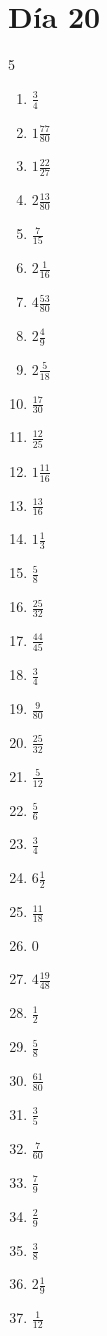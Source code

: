 \documentclass[12pt]{article}
\begin{document}
\section*{Día 20}
\begin{multicols}{5}\begin{enumerate}
\item $ \frac{3}{4} $
\item $ 1 \frac{77}{80} $
\item $ 1 \frac{22}{27} $
\item $ 2 \frac{13}{80} $
\item $ \frac{7}{15} $
\item $ 2 \frac{1}{16} $
\item $ 4 \frac{53}{80} $
\item $ 2 \frac{4}{9} $
\item $ 2 \frac{5}{18} $
\item $ \frac{17}{30} $
\item $ \frac{12}{25} $
\item $ 1 \frac{11}{16} $
\item $ \frac{13}{16} $
\item $ 1 \frac{1}{3} $
\item $ \frac{5}{8} $
\item $ \frac{25}{32} $
\item $ \frac{44}{45} $
\item $ \frac{3}{4} $
\item $ \frac{9}{80} $
\item $ \frac{25}{32} $
\item $ \frac{5}{12} $
\item $ \frac{5}{6} $
\item $ \frac{3}{4} $
\item $ 6 \frac{1}{2} $
\item $ \frac{11}{18} $
\item $ 0 $
\item $ 4 \frac{19}{48} $
\item $ \frac{1}{2} $
\item $ \frac{5}{8} $
\item $ \frac{61}{80} $
\item $ \frac{3}{5} $
\item $ \frac{7}{60} $
\item $ \frac{7}{9} $
\item $ \frac{2}{9} $
\item $ \frac{3}{8} $
\item $ 2 \frac{1}{9} $
\item $ \frac{1}{12} $

\end{enumerate}
\end{multicols}
\end{document}
